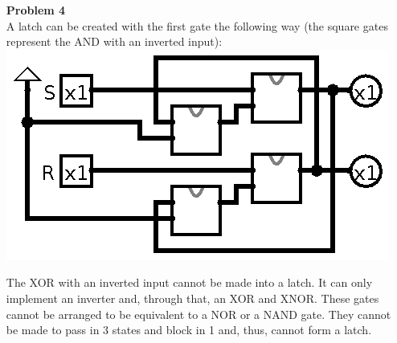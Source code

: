 \documentclass{article}
\begin{document}
\begin{itemize}
	\item [\textbf{Problem 4}]\hspace{0pt}\\
	A latch can be created with the first gate the following way (the square gates represent the AND with an inverted input):\\
	\includegraphics[scale=0.5]{hw4-4a}

	The XOR with an inverted input cannot be made into a latch. It can only implement an inverter and, through that, an XOR and XNOR. These gates cannot be arranged to be equivalent to a NOR or a NAND gate. They cannot be made to pass in 3 states and block in 1 and, thus, cannot form a latch. 

\end{itemize}
\end{document}
